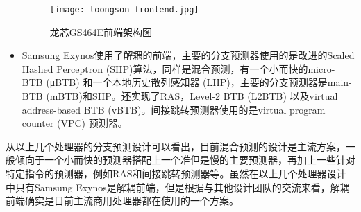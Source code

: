 \begin{itemize}[listparindent=2em]
    
    \begin{figure}[htb]
        \centering
        \setlength\tabcolsep{3pt}  %
        \vspace{5pt} %
        \texttt{[image: loongson-frontend.jpg]}
        \caption{龙芯GS464E前端架构图\cite{loongson}}
        \label{fig:figure12}
    \end{figure}
    
    \item Samsung Exynos\cite{samsung-exynos}使用了解耦的前端，主要的分支预测器使用的是改进的Scaled Hashed Perceptron (SHP)算法\cite{perceptrons,neural-branch,optimized-neural,strided-perceptron,merging-perceptron,revisited-perceptron}，同样是混合预测，有一个小而快的micro-BTB (μBTB) 和一个本地历史散列感知器 (LHP)，主要的分支预测器是main-BTB (mBTB)和SHP。还实现了RAS，Level-2 BTB (L2BTB) 以及virtual address-based BTB (vBTB)。间接跳转预测器使用的是virtual program counter (VPC)\cite{vpc} 预测器。
\end{itemize}

从以上几个处理器的分支预测设计可以看出，目前混合预测的设计是主流方案，一般倾向于一个小而快的预测器搭配上一个准但是慢的主要预测器，再加上一些针对特定指令的预测器，例如RAS和间接跳转预测器等。虽然在以上几个处理器设计中只有Samsung Exynos是解耦前端，但是根据与其他设计团队的交流来看，解耦前端确实是目前主流商用处理器都在使用的一个方案。




